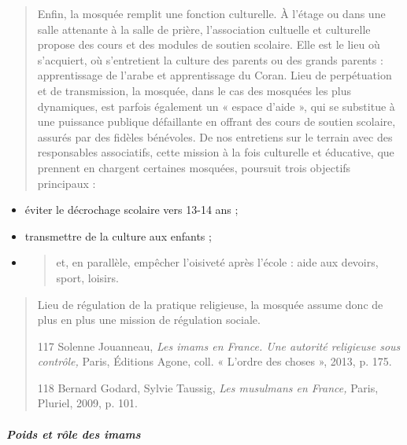 \begin{quote}
Enfin, la mosquée remplit une fonction culturelle. À l'étage ou dans une
salle attenante à la salle de prière, l'association cultuelle et
culturelle propose des cours et des modules de soutien scolaire. Elle
est le lieu où s'acquiert, où s'entretient la culture des parents ou des
grands parents : apprentissage de l'arabe et apprentissage du Coran.
Lieu de perpétuation et de transmission, la mosquée, dans le cas des
mosquées les plus dynamiques, est parfois également un « espace d'aide
», qui se substitue à une puissance publique défaillante en offrant des
cours de soutien scolaire, assurés par des fidèles bénévoles. De nos
entretiens sur le terrain avec des responsables associatifs, cette
mission à la fois culturelle et éducative, que prennent en chargent
certaines mosquées, poursuit trois objectifs principaux :
\end{quote}

\begin{itemize}
\item
  éviter le décrochage scolaire vers 13-14 ans ;
\item
  transmettre de la culture aux enfants ;
\item
  \begin{quote}
  et, en parallèle, empêcher l'oisiveté après l'école : aide aux
  devoirs, sport, loisirs.
  \end{quote}
\end{itemize}

\begin{quote}
Lieu de régulation de la pratique religieuse, la mosquée assume donc de
plus en plus une mission de régulation sociale.

117 Solenne Jouanneau, \emph{Les imams en France. Une autorité
religieuse sous contrôle,} Paris, Éditions Agone, coll. « L'ordre des
choses », 2013, p. 175.

118 Bernard Godard, Sylvie Taussig, \emph{Les musulmans en France,}
Paris, Pluriel, 2009, p. 101.


\end{quote}

\hypertarget{poids-et-ruxf4le-des-imams}{%
\subparagraph{Poids et rôle des
imams}\label{poids-et-ruxf4le-des-imams}}

